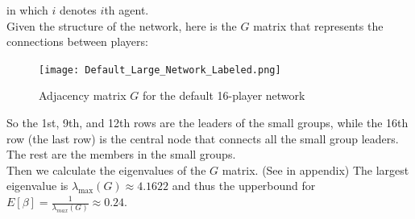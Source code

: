 \documentclass[12pt]{article}
\begin{document}
in which $i$ denotes $i$th agent.\\
\vspace{1em}
Given the structure of the network, here is the $G$ matrix that represents the connections between players:
\begin{figure}[H]
  \centering
  \texttt{[image: Default\_Large\_Network\_Labeled.png]}
  \caption{Adjacency matrix $G$ for the default 16-player network}
  \label{fig:G-matrix}
\end{figure}
So the 1st, 9th, and 12th rows are the leaders of the small groups, while the 16th row (the last row) is the central node that connects all the small group leaders. The rest are the members in the small groups.\\
Then we calculate the eigenvalues of the $G$ matrix. (See in appendix) The largest eigenvalue is $\lambda_{\text{max}}(G)  \approx 4.1622$ and thus the upperbound for $E[\beta] = \frac{1}{\lambda_{max}(G)} \approx 0.24$.\\
\end{document}
